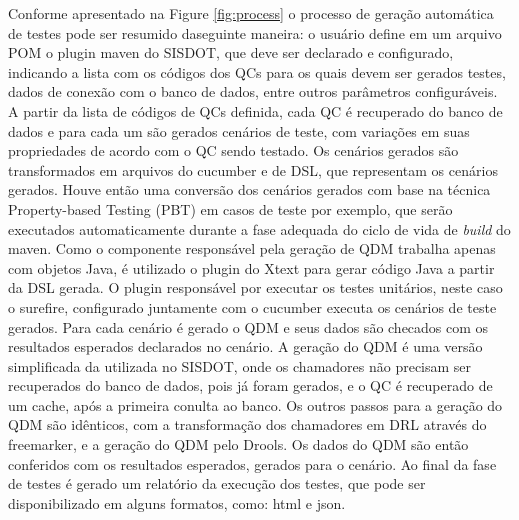 
Conforme apresentado na Figure \ref{fig:process} o processo de geração automática de testes pode ser resumido daseguinte maneira: o usuário define em um arquivo POM o plugin maven do SISDOT, que deve ser declarado e configurado, indicando a lista com os códigos dos QCs para os quais devem ser gerados testes, dados de conexão com o banco de dados, entre outros parâmetros configuráveis. A partir da lista de códigos de QCs definida, cada QC é recuperado do banco de dados e para cada um são gerados cenários de teste, com variações em suas propriedades de acordo com o QC sendo testado. Os cenários gerados são transformados em arquivos do cucumber e de DSL, que representam os cenários gerados. Houve então uma conversão dos cenários gerados com base na técnica Property-based Testing (PBT) em casos de teste por exemplo, que serão executados automaticamente durante a fase adequada do ciclo de vida de \textit{build} do maven. Como o componente responsável pela geração de QDM trabalha apenas com objetos Java, é utilizado o plugin do Xtext para gerar código Java a partir da DSL gerada. O plugin responsável por executar os testes unitários, neste caso o surefire, configurado juntamente com o cucumber executa os cenários de teste gerados. Para cada cenário é gerado o QDM e seus dados são checados com os resultados esperados declarados no cenário. A geração do QDM é uma versão simplificada da utilizada no SISDOT, onde os chamadores não precisam ser recuperados do banco de dados, pois já foram gerados, e o QC é recuperado de um cache, após a primeira conulta ao banco. Os outros passos para a geração do QDM são idênticos, com a transformação dos chamadores em DRL através do freemarker, e a geração do QDM pelo Drools. Os dados do QDM são então conferidos com os resultados esperados, gerados para o cenário. Ao final da fase de testes é gerado um relatório da execução dos testes, que pode ser disponibilizado em alguns formatos, como: html e json.



